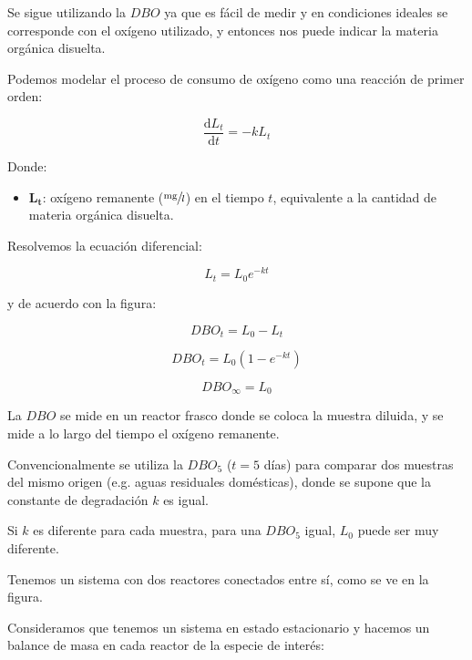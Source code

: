 \documentclass[11pt]{article}
\begin{document}
Se sigue utilizando la \( DBO \) ya que es fácil de medir y en condiciones ideales se corresponde con el oxígeno utilizado, y entonces nos puede indicar la materia orgánica disuelta.

Podemos modelar el proceso de consumo de oxígeno como una reacción de primer orden:

\[ \frac{ \mathrm d L_t }{ \mathrm d t } = - k L_t \]

Donde: 

\begin{itemize}
    \item \( \mathbf{L_t} \): oxígeno remanente (\( \sfrac{\text{mg}}{l} \)) en el tiempo \( t \), equivalente a la cantidad de materia orgánica disuelta.
\end{itemize}

Resolvemos la ecuación diferencial:

\[ L_t = L_0 e^{-kt} \]

y de acuerdo con la figura:

\[ DBO_t = L_0 - L_t \]

\[ \boxed{ DBO_t = L_0 \left( 1 - e^{-kt} \right) } \]

\[ \boxed{ DBO_\infty = L_0 } \]

La \( DBO \) se mide en un reactor frasco donde se coloca la muestra diluida, y se mide a lo largo del tiempo el oxígeno remanente.

Convencionalmente se utiliza la \( DBO_5 \) (\( t = 5 \) días) para comparar dos muestras del mismo origen (e.g. aguas residuales domésticas), donde se supone que la constante de degradación \( k \) es igual.

Si \( k \) es diferente para cada muestra, para una \( DBO_5 \) igual, \( L_0 \) puede ser muy diferente.


Tenemos un sistema con dos reactores conectados entre sí, como se ve en la figura.

Consideramos que tenemos un sistema en estado estacionario y hacemos un balance de masa en cada reactor de la especie de interés:

\end{document}
